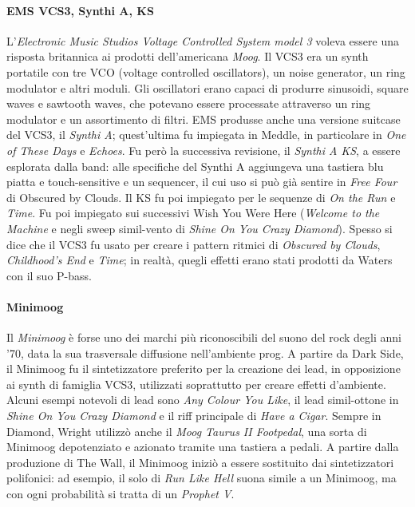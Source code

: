\documentclass[class=book, crop=false, oneside, 12pt]{standalone}
\begin{document}
    \paragraph{EMS VCS3, Synthi A, KS}
    L'\emph{Electronic Music Studios Voltage Controlled System model 3} voleva essere una risposta britannica ai prodotti dell'americana \emph{Moog}. Il VCS3 era un synth portatile con tre VCO (voltage controlled oscillators), un noise generator, un ring modulator e altri moduli. Gli oscillatori erano capaci di produrre sinusoidi, square waves e sawtooth waves, che potevano essere processate attraverso un ring modulator e un assortimento di filtri. EMS produsse anche una versione suitcase del VCS3, il \emph{Synthi A}; quest'ultima fu impiegata in Meddle, in particolare in \emph{One of These Days} e \emph{Echoes}. Fu però la successiva revisione, il \emph{Synthi A KS}, a essere esplorata dalla band: alle specifiche del Synthi A aggiungeva una tastiera blu piatta e touch-sensitive e un sequencer, il cui uso si può già sentire in \emph{Free Four} di Obscured by Clouds. Il KS fu poi impiegato per le sequenze di \emph{On the Run} e \emph{Time}. Fu poi impiegato sui successivi Wish You Were Here (\emph{Welcome to the Machine} e negli sweep simil-vento di \emph{Shine On You Crazy Diamond}). Spesso si dice che il VCS3 fu usato per creare i pattern ritmici di \emph{Obscured by Clouds}, \emph{Childhood's End} e \emph{Time}; in realtà, quegli effetti erano stati prodotti da Waters con il suo P-bass.

    \paragraph{Minimoog}
    Il \emph{Minimoog} è forse uno dei marchi più riconoscibili del suono del rock degli anni '70, data la sua trasversale diffusione nell'ambiente prog. A partire da Dark Side, il Minimoog fu il sintetizzatore preferito per la creazione dei lead, in opposizione ai synth di famiglia VCS3, utilizzati soprattutto per creare effetti d'ambiente. Alcuni esempi notevoli di lead sono \emph{Any Colour You Like}, il lead simil-ottone in \emph{Shine On You Crazy Diamond} e il riff principale di \emph{Have a Cigar}. Sempre in Diamond, Wright utilizzò anche il \emph{Moog Taurus II Footpedal}, una sorta di Minimoog depotenziato  e azionato tramite una tastiera a pedali. A partire dalla produzione di The Wall, il Minimoog iniziò a essere sostituito dai sintetizzatori polifonici: ad esempio, il solo di \emph{Run Like Hell} suona simile a un Minimoog, ma con ogni probabilità si tratta di un \emph{Prophet V}.
\end{document}
